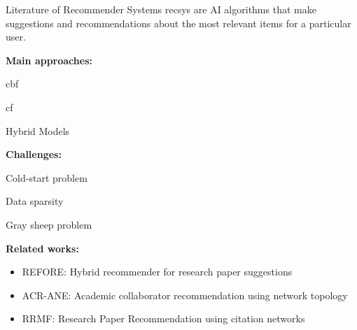 \begin{tframe}{Literature of Recommender Systems}
    \gls{recsys} are AI algorithms that make suggestions and recommendations about the most relevant items for a particular user.
    
    \vspace{0.2cm}

    \begin{minipage}[t]{.5\linewidth}
        \textbf{Main approaches:}
        \begin{adv}
            \item \gls{cbf}
            \item \gls{cf}
            \item Hybrid Models
        \end{adv}
    \end{minipage}%
    \hfill%
    \begin{minipage}[t]{.5\linewidth}
        \textbf{Challenges:}
        \begin{disadv}
            \item Cold-start problem
            \item Data sparsity
            \item Gray sheep problem
        \end{disadv}
    \end{minipage}

    \vspace{0.2cm}

    \textbf{Related works:}
    \begin{itemize}
        \item REFORE: Hybrid recommender for research paper suggestions~\cite{refore}
        \item ACR-ANE: Academic collaborator recommendation using network topology~\cite{Du2022}
        \item RRMF: Research Paper Recommendation using citation networks~\cite{Kanwal2024}
    \end{itemize}
\end{tframe}